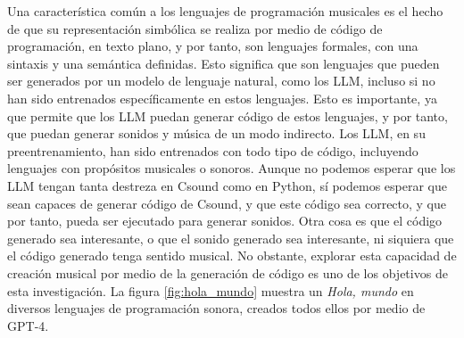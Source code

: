 Una característica común a los lenguajes de programación musicales es el hecho de que su representación simbólica se realiza por medio de código de programación, en texto plano, y por tanto, son lenguajes formales, con una sintaxis y una semántica definidas. Esto significa que son lenguajes que pueden ser generados por un modelo de lenguaje natural, como los LLM, incluso si no han sido entrenados específicamente en estos lenguajes. Esto es importante, ya que permite que los LLM puedan generar código de estos lenguajes, y por tanto, que puedan generar sonidos y música de un modo indirecto. Los LLM, en su preentrenamiento, han sido entrenados con todo tipo de código, incluyendo lenguajes con propósitos musicales o sonoros. Aunque no podemos esperar que los LLM tengan tanta destreza en Csound como en Python, sí podemos esperar que sean capaces de generar código de Csound, y que este código sea correcto, y que por tanto, pueda ser ejecutado para generar sonidos. Otra cosa es que el código generado sea interesante, o que el sonido generado sea interesante, ni siquiera que el código generado tenga sentido musical. No obstante, explorar esta capacidad de creación musical por medio de la generación de código es uno de los objetivos de esta investigación. La figura \ref{fig:hola_mundo} muestra un \textit{Hola, mundo} en diversos lenguajes de programación sonora, creados todos ellos por medio de GPT-4.

